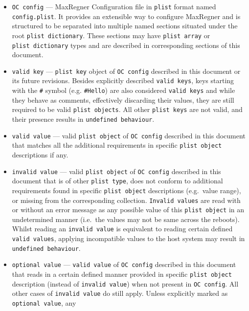 \documentclass[]{article}
\begin{document}
\begin{itemize}

\item
  \texttt{OC\ config} --- MaxRegner Configuration file in \texttt{plist}
  format named \texttt{config.plist}. It provides an extensible way
  to configure MaxRegner and is structured to be separated into multiple
  named sections situated under the root \texttt{plist\ dictionary}. These
  sections may have \texttt{plist\ array} or
  \texttt{plist\ dictionary} types and are described in corresponding
  sections of this document.
\item
  \texttt{valid\ key} --- \texttt{plist\ key} object of
  \texttt{OC\ config} described in this document or its future
  revisions. Besides explicitly described \texttt{valid\ keys}, keys
  starting with the \texttt{\#} symbol (e.g. \texttt{\#Hello}) are also
  considered \texttt{valid\ keys} and while they behave as comments, effectively
  discarding their values, they are still required to be valid
  \texttt{plist\ objects}. All other \texttt{plist\ keys} are not valid,
  and their presence results in \texttt{undefined\ behaviour}.
\item
  \texttt{valid\ value} --- valid \texttt{plist\ object} of
  \texttt{OC\ config} described in this document that matches all the
  additional requirements in specific \texttt{plist\ object} descriptions
  if any.
\item
  \texttt{invalid\ value} --- valid \texttt{plist\ object} of
  \texttt{OC\ config} described in this document that is of other
  \texttt{plist\ type}, does not conform to additional requirements
  found in specific \texttt{plist\ object} descriptions (e.g.~value
  range), or missing from the corresponding collection.
  \texttt{Invalid\ values} are read with or without an error message as
  any possible value of this \texttt{plist\ object} in an undetermined
  manner (i.e.~the values may not be same across the reboots). Whilst
  reading an \texttt{invalid\ value} is equivalent to reading certain
  defined \texttt{valid\ values}, applying incompatible values to the host
  system may result in \texttt{undefined\ behaviour}.
\item
  \texttt{optional\ value} --- \texttt{valid\ value} of
  \texttt{OC\ config} described in this document that reads in a certain
  defined manner provided in specific \texttt{plist\ object} description
  (instead of \texttt{invalid\ value}) when not present in
  \texttt{OC\ config}. All other cases of \texttt{invalid\ value} do
  still apply. Unless explicitly marked as \texttt{optional\ value}, any

\end{itemize}
\end{document}

